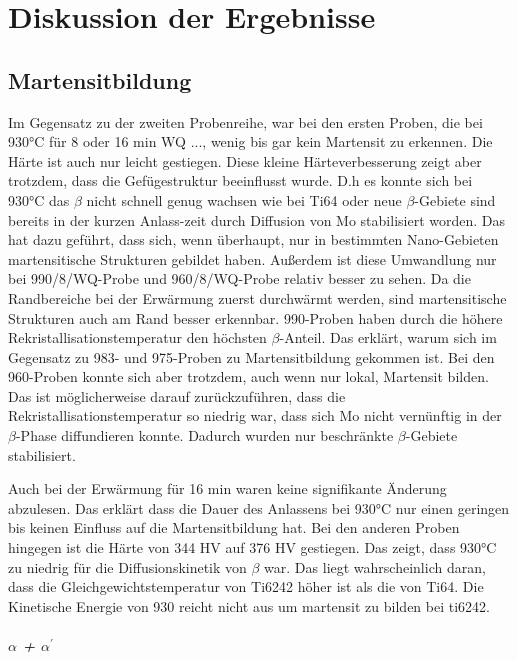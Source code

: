 \chapter{Diskussion der Ergebnisse}

\section{Martensitbildung}


Im Gegensatz zu der zweiten Probenreihe, war  bei den ersten Proben, die bei 930°C für 8   oder 16 min WQ ..., wenig bis gar kein Martensit zu erkennen. Die Härte ist auch nur leicht gestiegen. Diese kleine Härteverbesserung zeigt aber trotzdem, dass  die Gefügestruktur  beeinflusst wurde. D.h es konnte sich bei 930°C das $\beta$ nicht schnell genug wachsen wie bei Ti64 oder neue $\beta$-Gebiete sind bereits in der kurzen Anlass-zeit  durch Diffusion von Mo stabilisiert worden. 
Das hat dazu geführt, dass sich, wenn überhaupt, nur in bestimmten Nano-Gebieten martensitische Strukturen gebildet haben. Außerdem ist diese Umwandlung nur bei  990/8/WQ-Probe und 960/8/WQ-Probe relativ besser zu sehen. Da die Randbereiche bei der Erwärmung zuerst durchwärmt werden, sind martensitische Strukturen auch am Rand besser erkennbar.
990-Proben haben durch die höhere Rekristallisationstemperatur den höchsten $\beta$-Anteil. Das erklärt, warum sich im Gegensatz zu 983- und 975-Proben zu Martensitbildung gekommen ist.
Bei den 960-Proben konnte sich aber trotzdem, auch wenn nur  lokal, Martensit bilden. Das ist möglicherweise darauf zurückzuführen, dass die Rekristallisationstemperatur  so niedrig war, dass sich Mo nicht vernünftig  in der $\beta$-Phase diffundieren konnte. Dadurch wurden nur beschränkte $\beta$-Gebiete stabilisiert.

Auch bei der Erwärmung für 16 min waren keine signifikante Änderung abzulesen. Das erklärt dass die Dauer des Anlassens bei 930°C nur einen geringen bis keinen Einfluss auf die Martensitbildung hat. 
Bei den anderen Proben hingegen ist die Härte von 344 HV auf 376 HV gestiegen. 
Das zeigt, dass 930°C zu niedrig  für die Diffusionskinetik von $\beta$ war. Das liegt wahrscheinlich daran, dass die Gleichgewichtstemperatur von Ti6242 höher ist als die von Ti64. Die Kinetische Energie von 930 reicht nicht aus um martensit zu bilden bei ti6242.

\paragraph{$\alpha$ + $\alpha^\prime$}


